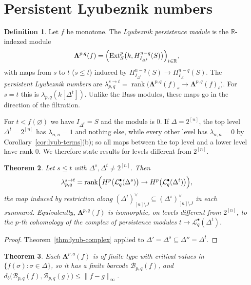 \documentclass[11pt]{article}
\theoremstyle{plain}
\newtheorem{theorem}{Theorem}[section]
\theoremstyle{definition}
\newtheorem{definition}[theorem]{Definition}
\newcommand{\kk}{k}
\newcommand{\RR}{\mathbb{R}}
\newcommand{\Ext}{\operatorname{Ext}}
\newcommand{\rank}{\operatorname{rank}}
\newcommand{\Hloc}[2]{H^{#1}_{#2}}
\newcommand{\Lc}{\mathcal L}
\begin{document}
\section{Persistent Lyubeznik numbers}\label{sec:lyub-persistent}

\begin{definition}\label{def:pers-lyub}
Let $f$ be monotone. The \emph{Lyubeznik persistence module} is the $\RR$-indexed module
\[
\boldsymbol\Lambda^{p,q}(f)=\Bigl(\Ext^p_S\bigl(\kk,\Hloc{n-q}{I_{\Delta^t}}(S)\bigr)\Bigr)_{t\in\RR},
\]
with maps from $s$ to $t$ ($s\le t$) induced by $\Hloc{n-q}{I_{\Delta^s}}(S)\to\Hloc{n-q}{I_{\Delta^t}}(S)$. The
\emph{persistent Lyubeznik numbers} are $\lambda^{s\to t}_{p,q}=\rank\bigl(\boldsymbol\Lambda^{p,q}(f)_s\to\boldsymbol\Lambda^{p,q}(f)_t\bigr)$.
For $s=t$ this is $\lambda_{p,q}(\kk[\Delta^t])$. Unlike the Bass modules, these maps go in the direction of the
filtration.
\end{definition}

For $t<f(\varnothing)$ we have $I_{\Delta^t}=S$ and the module is $0$. If $\Delta=2^{[n]}$, the top level
$\Delta^t=2^{[n]}$ has $\lambda_{n,n}=1$ and nothing else, while every other level has $\lambda_{n,n}=0$ by
Corollary~\ref{cor:lyub-terms}(b); so all maps between the top level and a lower level have rank $0$. We therefore
state results for levels different from $2^{[n]}$.

\begin{theorem}\label{thm:lyub-persistent}
Let $s\le t$ with $\Delta^s,\Delta^t\neq2^{[n]}$. Then
\[
\lambda^{s\to t}_{p,q}=\rank\Bigl(H^p\bigl(\Lc^\bullet_q(\Delta^s)\bigr)\to H^p\bigl(\Lc^\bullet_q(\Delta^t)\bigr)\Bigr),
\]
the map induced by restriction along $(\Delta^t)^\vee_{[n]\setminus J}\subseteq(\Delta^s)^\vee_{[n]\setminus J}$ in each
summand. Equivalently, $\boldsymbol\Lambda^{p,q}(f)$ is isomorphic, on levels different from $2^{[n]}$, to the $p$-th
cohomology of the complex of persistence modules $t\mapsto\Lc^\bullet_q(\Delta^t)$.
\end{theorem}

\begin{proof}
Theorem~\ref{thm:lyub-complex} applied to $\Delta'=\Delta^s\subseteq\Delta''=\Delta^t$.
\end{proof}

\begin{theorem}\label{thm:lyub-stability}
Each $\boldsymbol\Lambda^{p,q}(f)$ is of finite type with critical values in $\{f(\sigma):\sigma\in\Delta\}$, so it has
a finite barcode $\mathcal B_{p,q}(f)$, and $d_b\bigl(\mathcal B_{p,q}(f),\mathcal B_{p,q}(g)\bigr)\le\|f-g\|_\infty$.
\end{theorem}
\end{document}
